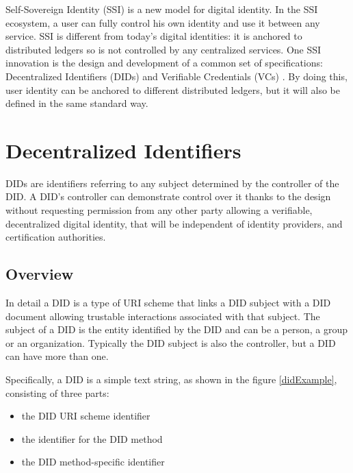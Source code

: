 
Self-Sovereign Identity (SSI) \cite{tobin2016inevitable} is a new model for digital identity. In the SSI ecosystem, a user can fully control his own identity and use it between any service. SSI is different from today's digital identities: it is anchored to distributed ledgers so is not controlled by any centralized services.
One SSI innovation is the design and development of a common set of specifications: 
Decentralized Identifiers (DIDs) \cite{didW3C} and Verifiable Credentials (VCs) \cite{vcW3C}. By doing this, user identity can be anchored to different distributed ledgers, but it will also be defined in the same standard way.

\section{Decentralized Identifiers}  
DIDs \cite{didW3C} are identifiers referring to any subject determined by the controller of the DID.
A DID's controller can demonstrate control over it thanks to the design without requesting permission from any other party allowing a verifiable, decentralized digital identity, that will be independent of identity providers, and certification authorities.

\subsection*{Overview}

In detail a DID is a type of URI \cite{berners2005uniform} scheme that links a DID subject with a DID document allowing trustable interactions associated with that subject. The subject of a DID is the entity identified by the DID and can be a person, a group or an organization. Typically the DID subject is also the controller, but a DID can have more than one. 

Specifically, a DID is a simple text string, as shown in the figure \ref{didExample}, consisting of three parts: 
\begin{itemize}
    \item the DID URI scheme identifier
    \item the identifier for the DID method
    \item the DID method-specific identifier
\end{itemize}

